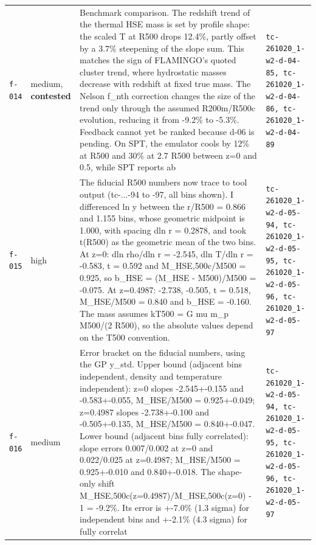 \documentclass[11pt,a4paper]{article}
\begin{document}
\begin{longtable}{@{}p{}p{}p{}p{}@{}}
\texttt{f-014} & medium, \textbf{contested} & Benchmark comparison. The redshift trend of the thermal HSE mass is set by profile shape: the scaled T at R500 drops 12.4\%, partly offset by a 3.7\% steepening of the slope sum. This matches the sign of FLAMINGO's quoted cluster trend, where hydrostatic masses decrease with redshift at fixed true mass. The Nelson f\_nth correction changes the size of the trend only through the assumed R200m/R500c evolution, reducing it from -9.2\% to -5.3\%. Feedback cannot yet be ranked because d-06 is pending. On SPT, the emulator cools by 12\% at R500 and 30\% at 2.7 R500 between z=0 and 0.5, while SPT reports ab & \texttt{tc-261020\_\allowbreak{}1-w2-d-04-85,\allowbreak{} tc-261020\_\allowbreak{}1-w2-d-04-86,\allowbreak{} tc-261020\_\allowbreak{}1-w2-d-04-89} \\
\texttt{f-015} & high & The fiducial R500 numbers now trace to tool output (tc-...-94 to -97, all bins shown). I differenced ln y between the r/R500 = 0.866 and 1.155 bins, whose geometric midpoint is 1.000, with spacing dln r = 0.2878, and took t(R500) as the geometric mean of the two bins. At z=0: dln rho/dln r = -2.545, dln T/dln r = -0.583, t = 0.592 and M\_HSE,500c/M500 = 0.925, so b\_HSE = (M\_HSE - M500)/M500 = -0.075. At z=0.4987: -2.738, -0.505, t = 0.518, M\_HSE/M500 = 0.840 and b\_HSE = -0.160. The mass assumes kT500 = G mu m\_p M500/(2 R500), so the absolute values depend on the T500 convention. & \texttt{tc-261020\_\allowbreak{}1-w2-d-05-94,\allowbreak{} tc-261020\_\allowbreak{}1-w2-d-05-95,\allowbreak{} tc-261020\_\allowbreak{}1-w2-d-05-96,\allowbreak{} tc-261020\_\allowbreak{}1-w2-d-05-97} \\
\texttt{f-016} & medium & Error bracket on the fiducial numbers, using the GP y\_std. Upper bound (adjacent bins independent, density and temperature independent): z=0 slopes -2.545+-0.155 and -0.583+-0.055, M\_HSE/M500 = 0.925+-0.049; z=0.4987 slopes -2.738+-0.100 and -0.505+-0.135, M\_HSE/M500 = 0.840+-0.047. Lower bound (adjacent bins fully correlated): slope errors 0.007/0.002 at z=0 and 0.022/0.025 at z=0.4987; M\_HSE/M500 = 0.925+-0.010 and 0.840+-0.018. The shape-only shift M\_HSE,500c(z=0.4987)/M\_HSE,500c(z=0) - 1 = -9.2\%. Its error is +-7.0\% (1.3 sigma) for independent bins and +-2.1\% (4.3 sigma) for fully correlat & \texttt{tc-261020\_\allowbreak{}1-w2-d-05-94,\allowbreak{} tc-261020\_\allowbreak{}1-w2-d-05-95,\allowbreak{} tc-261020\_\allowbreak{}1-w2-d-05-96,\allowbreak{} tc-261020\_\allowbreak{}1-w2-d-05-97} \\

\end{longtable}
\end{document}
